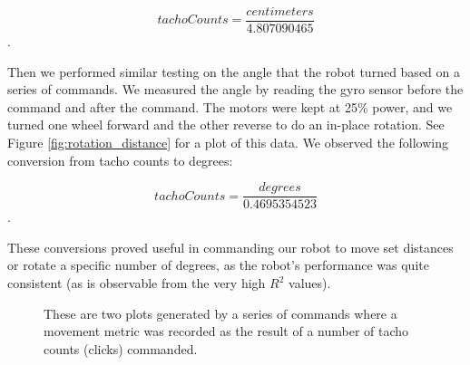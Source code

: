 \documentclass[12pt]{article}
\begin{document}
\[tachoCounts=\frac{centimeters}{4.807090465}\].

Then we performed similar testing on the angle that the robot turned based on a series of commands. We measured the angle by reading the gyro sensor before the command and after the command. The motors were kept at 25\% power, and we turned one wheel forward and the other reverse to do an in-place rotation. See Figure \ref{fig:rotation_distance} for a plot of this data. We observed the following conversion from tacho counts to degrees:

\[tachoCounts=\frac{degrees}{0.4695354523}\].

These conversions proved useful in commanding our robot to move set distances or rotate a specific number of degrees, as the robot's performance was quite consistent (as is observable from the very high $R^2$ values).

\begin{figure}
	\hfill
	
	\label{fig:distance_testing}
	\caption{These are two plots generated by a series of commands where a movement metric was recorded as the result of a number of tacho counts (clicks) commanded.}
	
\end{figure}
\end{document}
